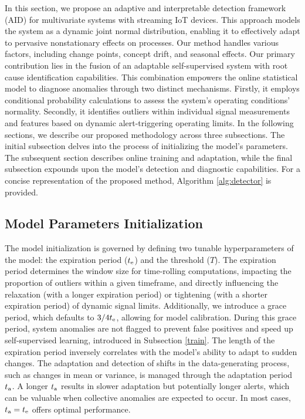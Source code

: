 In this section, we propose an adaptive and interpretable detection framework (AID) for multivariate systems with streaming IoT devices. This approach models the system as a dynamic joint normal distribution, enabling it to effectively adapt to pervasive nonstationary effects on processes. Our method handles various factors, including change points, concept drift, and seasonal effects. Our primary contribution lies in the fusion of an adaptable self-supervised system with root cause identification capabilities. This combination empowers the online statistical model to diagnose anomalies through two distinct mechanisms. Firstly, it employs conditional probability calculations to assess the system's operating conditions' normality. Secondly, it identifies outliers within individual signal measurements and features based on dynamic alert-triggering operating limits. In the following sections, we describe our proposed methodology across three subsections. The initial subsection delves into the process of initializing the model's parameters. The subsequent section describes online training and adaptation, while the final subsection expounds upon the model's detection and diagnostic capabilities. For a concise representation of the proposed method, Algorithm \ref{alg:detector} is provided.

\subsection{Model Parameters Initialization}\label{init}
The model initialization is governed by defining two tunable hyperparameters of the model: the expiration period ($t _{\text{e}}$) and the threshold ($T$). The expiration period determines the window size for time-rolling computations, impacting the proportion of outliers within a given timeframe, and directly influencing the relaxation (with a longer expiration period) or tightening (with a shorter expiration period) of dynamic signal limits. Additionally, we introduce a grace period, which defaults to $3/4 t _{\text{e}}$, allowing for model calibration. During this grace period, system anomalies are not flagged to prevent false positives and speed up self-supervised learning, introduced in Subsection \ref{train}. The length of the expiration period inversely correlates with the model's ability to adapt to sudden changes. The adaptation and detection of shifts in the data-generating process, such as changes in mean or variance, is managed through the adaptation period $t _{\text{a}}$. A longer $t _{\text{a}}$ results in slower adaptation but potentially longer alerts, which can be valuable when collective anomalies are expected to occur. In most cases, $t _{\text{a}} = t _{\text{e}}$ offers optimal performance.

